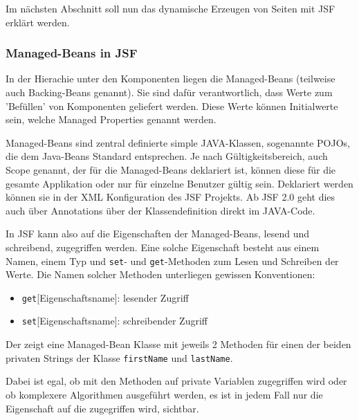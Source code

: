 Im nächsten Abschnitt soll nun das dynamische Erzeugen von Seiten mit JSF erklärt werden.

\subsubsection{Managed-Beans in JSF}

In der Hierachie unter den Komponenten liegen die Managed-Beans (teilweise auch Backing-Beans genannt). Sie sind dafür verantwortlich, dass Werte zum 'Befüllen' von Komponenten geliefert werden. Diese Werte können Initialwerte sein, welche Managed Properties genannt werden.

Managed-Beans sind zentral definierte simple JAVA-Klassen, sogenannte \glspl{POJO}, die dem Java-Beans Standard entsprechen.
Je nach Gültigkeitsbereich, auch Scope genannt, der für die Managed-Beans deklariert ist, können diese für die gesamte Applikation oder nur für einzelne Benutzer gültig sein.
Deklariert werden können sie in der XML Konfiguration des JSF Projekts. Ab JSF 2.0 geht dies auch über Annotations über der Klassendefinition direkt im JAVA-Code. 

In JSF kann also auf die Eigenschaften der Managed-Beans, lesend und schreibend, zugegriffen werden. 
Eine solche Eigenschaft besteht aus einem Namen, einem Typ und \texttt{set}- und \texttt{get}-Methoden zum Lesen und Schreiben der Werte.
Die Namen solcher Methoden unterliegen gewissen Konventionen:
\begin{itemize}
  \item \texttt{get}[Eigenschaftsname]: lesender Zugriff
  \item \texttt{set}[Eigenschaftsname]: schreibender Zugriff
\end{itemize}

Der  zeigt eine Managed-Bean Klasse mit jeweils 2 Methoden für einen der beiden privaten Strings der Klasse \texttt{firstName} und \texttt{lastName}.

	

Dabei ist egal, ob mit den Methoden auf private Variablen zugegriffen wird oder ob komplexere Algorithmen ausgeführt werden, es ist in jedem Fall nur die Eigenschaft auf die zugegriffen wird, sichtbar.

